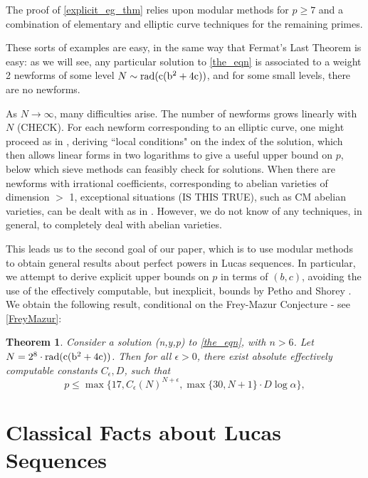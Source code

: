 \documentclass[12pt]{amsart}
\newtheorem{thm}{Theorem}[section]
\theoremstyle{definition}
\newcommand{\rad}{\rm rad}
\begin{document}
The proof of \ref{explicit_eg_thm} relies upon modular methods for $p \geq 7$ and a combination of elementary and elliptic curve techniques for the remaining primes. 

These sorts of examples are easy, in the same way that Fermat's Last Theorem is easy: as we will see, any particular solution to \eqref{the_eqn} is associated to a weight 2 newforms of some level $N \sim \rad(c(b^2+4c))$, and for some small levels, there are no newforms.

As $N \to \infty$, many difficulties arise. The number of newforms grows linearly with $N$ (CHECK). For each newform corresponding to an elliptic curve, one might proceed as in \cite{siksek06}, deriving ``local conditions" on the index of the solution, which then allows linear forms in two logarithms to give a useful upper bound on $p$, below which sieve methods can feasibly check for solutions. When there are newforms with irrational coefficients, corresponding to abelian varieties of dimension $>$ 1, exceptional situations (IS THIS TRUE), such as CM abelian varieties, can be dealt with as in \cite{bennett04}. However, we do not know of any techniques, in general, to completely deal with abelian varieties.

This leads us to the second goal of our paper, which is to use modular methods to obtain general results about perfect powers in Lucas sequences. In particular, we attempt to derive explicit upper bounds on $p$ in terms of $(b,c)$, avoiding the use of the effectively computable, but inexplicit, bounds by Petho and Shorey \cite{petho82}\cite{shorey83}. We obtain the following result, conditional on the Frey-Mazur Conjecture - see \ref{FreyMazur}:

\begin{thm}\label{condbound}
Consider a solution (n,y,p) to \eqref{the_eqn}, with $n > 6$. Let $N = 2^8 \cdot \rad(c(b^2+4c))$. Then for all $\epsilon > 0$, there exist absolute effectively computable constants $C_{\epsilon}, D$, such that
\[ p \leq \max\{17, C_{\epsilon} \left( N \right)^{N + \epsilon}, \max\{30, N+1\} \cdot D\log{\alpha} \}, \]

\end{thm}

\tableofcontents

\section{Classical Facts about Lucas Sequences}
\end{document}

